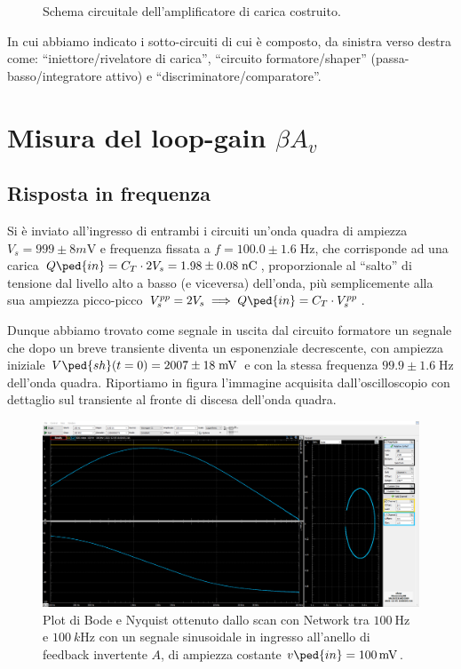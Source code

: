 \documentclass[10pt, a4paper, italian]{article}
\begin{document}
\begin{figure}[htbp]
    \centering
    \caption{Schema circuitale dell'amplificatore di carica costruito.
    \label{fig: Qampschm}}
\end{figure}

In cui abbiamo indicato i sotto-circuiti di cui è composto, da sinistra verso
destra come: ``iniettore/rivelatore di carica'', ``circuito formatore/shaper''
(passa-basso/integratore attivo) e ``discriminatore/comparatore''.

\section{Misura del loop-gain $\beta A_v$}

\subsection{Risposta in frequenza}
Si è inviato all'ingresso di entrambi i circuiti un'onda quadra di
ampiezza $V_s = 999 \pm 8 \si{m\V}$ e frequenza fissata a
$f = 100.0 \pm 1.6 \; \si{\Hz}$, che corrisponde ad una carica
$Q\ped{in} = C_T \cdot 2V_s = 1.98 \pm 0.08 \; \si{n\coulomb}$, proporzionale
al ``salto'' di tensione dal livello alto a basso (e viceversa) dell'onda,
più semplicemente alla sua ampiezza picco-picco
$V_s^{pp} = 2 V_s \implies Q\ped{in} = C_T \cdot V_s^{pp}$.

Dunque abbiamo trovato come segnale in uscita dal circuito formatore un
segnale che dopo un breve transiente diventa un esponenziale decrescente,
con ampiezza iniziale $V\ped{sh} (t=0) = 2007 \pm 18 \; \si{m\V}$ e
con la stessa frequenza $99.9 \pm 1.6 \; \si{\Hz}$ dell'onda quadra.
Riportiamo in figura l'immagine acquisita dall'oscilloscopio con dettaglio
sul transiente al fronte di discesa dell'onda quadra.
\begin{figure}[htbp]
    \centering
	\includegraphics[scale=0.335]{Aloop100Hz}
    \caption{Plot di Bode e Nyquist ottenuto dallo scan con Network tra
    $\SI{100}{\Hz}$ e $\SI{100}{k\Hz}$ con un segnale sinusoidale in ingresso
    all'anello di feedback invertente $A$, di ampiezza costante
    $v\ped{in} = \SI{100}{m\V}$. \label{fig: loopbode}}
\end{figure}
\end{document}
